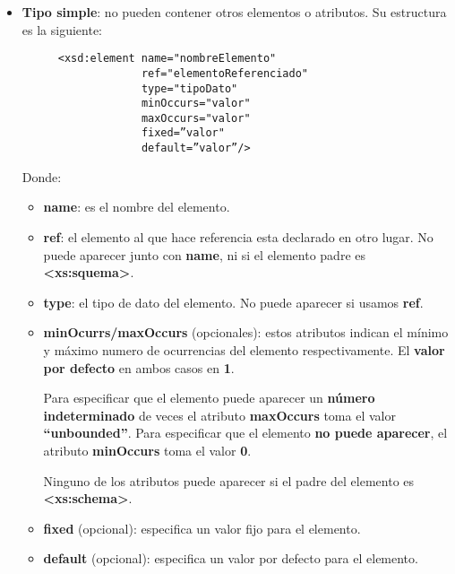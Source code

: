 \begin{itemize}
    \item \textbf{Tipo simple}: no pueden contener otros elementos o atributos. Su estructura es la siguiente:

    \begin{figure}[H]
        \begin{tcolorbox}[sharp corners, colback=yellow!30, colframe=white!20]
            \scriptsize
            \begin{verbatim}
<xsd:element name="nombreElemento"
             ref="elementoReferenciado"
             type="tipoDato"
             minOccurs="valor"
             maxOccurs="valor"
             fixed=”valor"
             default=”valor”/>
            \end{verbatim}
        \end{tcolorbox}
    \end{figure}

    Donde:

    \begin{itemize}
        \item \textbf{name}: es el nombre del elemento.
        \item \textbf{ref}: el elemento al que hace referencia esta declarado en otro lugar. No puede aparecer junto con \textbf{name}, ni si el elemento padre es \textbf{<xs:squema>}.
        \item \textbf{type}: el tipo de dato del elemento. No puede aparecer si usamos \textbf{ref}.
        \item \textbf{minOcurrs/maxOccurs} (opcionales): estos atributos indican el mínimo y máximo numero de ocurrencias del elemento respectivamente. El \textbf{valor por defecto} en ambos casos en \textbf{1}.

        Para especificar que el elemento puede aparecer un \textbf{número indeterminado} de veces el atributo \textbf{maxOccurs} toma el valor \textbf{``unbounded''}. Para especificar que el elemento \textbf{no puede aparecer}, el atributo \textbf{minOccurs} toma el valor \textbf{0}.

        Ninguno de los atributos puede aparecer si el padre del elemento es \textbf{<xs:schema>}.

        \item \textbf{fixed} (opcional): especifica un valor fijo para el elemento.
        \item \textbf{default} (opcional): especifica un valor por defecto para el elemento.
    \end{itemize}



\end{itemize}
